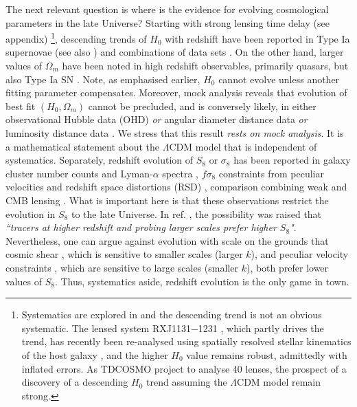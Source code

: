 \documentclass[a4paper,11pt]{article}
\begin{document}
The next relevant question is where is the evidence for evolving cosmological parameters in the late Universe? Starting with strong lensing time delay \cite{Wong:2019kwg} (see appendix) 
\footnote{Systematics are explored in \cite{Millon:2019slk} and the descending trend is not an obvious systematic. The lensed system RXJ1131−1231 \cite{}, which partly drives the trend, has recently been re-analysed using spatially resolved stellar kinematics of the host galaxy \cite{Shajib:2023uig}, and the higher $H_0$ value remains robust, admittedly with inflated errors. As TDCOSMO project to analyse 40 lenses, the prospect of a discovery of a descending $H_0$ trend assuming the $\Lambda$CDM model remain strong.}, descending trends of $H_0$ with redshift have been reported in Type Ia supernovae \cite{Dainotti:2021pqg} (see also \cite{}) and combinations of data sets \cite{Dainotti:2022bzg}. On the other hand, larger values of $\Omega_m$ have been noted in high redshift observables, primarily quasars, but also Type Ia SN \cite{}. Note, as emphasised earlier, $H_0$ cannot evolve unless another fitting parameter compensates. Moreover, mock analysis reveals that evolution of best fit $(H_0, \Omega_m)$ cannot be precluded, and is conversely likely, in either observational Hubble data (OHD) \textit{or} angular diameter distance data \textit{or} luminosity distance data \cite{Colgain:2022tql}. We stress that this result \textit{rests on mock analysis}. It is a mathematical statement about the $\Lambda$CDM model that is independent of systematics. Separately, redshift evolution of $S_8$ or $\sigma_8$ has been reported in galaxy cluster number counts and Lyman-$\alpha$ spectra \cite{Esposito:2022plo}, $f \sigma_8$ constraints from peculiar velocities and redshift space distortions (RSD) 
 \cite{Adil:2023jtu}, comparison combining weak \cite{HSC:2018mrq, KiDS:2020suj, DES:2021wwk} and CMB lensing \cite{ACT:2023dou, ACT:2023kun}. What is important here is that these observations restrict the evolution in $S_8$ to the late Universe. In ref. \cite{ACT:2023ipp}, the possibility was raised that \textit{``tracers at higher redshift and probing larger scales prefer higher $S_8$"}. Nevertheless, one can argue against evolution with scale on the grounds that cosmic shear \cite{HSC:2018mrq, KiDS:2020suj, DES:2021wwk}, which is sensitive to smaller scales (larger $k$), and peculiar velocity constraints \cite{}, which are sensitive to large scales (smaller $k$), both prefer lower values of $S_8$. Thus, systematics aside, redshift evolution is the only game in town. 
\end{document}
